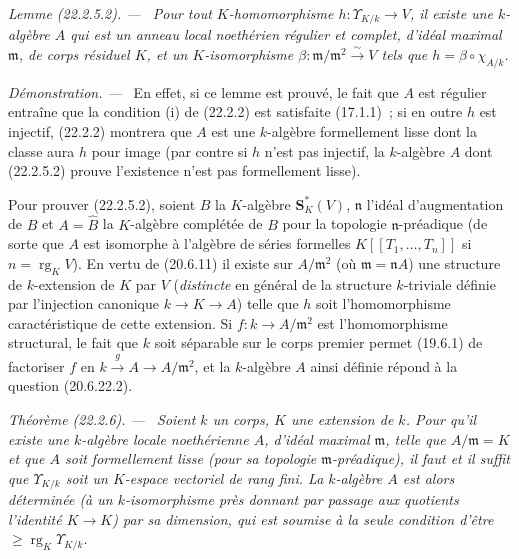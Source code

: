\documentclass[10pt,oneside]{book}
\makeatletter
\newcommand{\setmanualcurrentlabel}[1]{\def\@currentlabel{#1}}
\newenvironment{theorem}[1][]{%
  \setmanualcurrentlabel{#1}\par\medskip\noindent\itshape Théorème (#1). ---\ }{\par}
\newenvironment{lemma}[1][]{%
  \setmanualcurrentlabel{#1}\par\medskip\noindent\itshape Lemme (#1). ---\ }{\par}
\newenvironment{proof}{%
  \par\medskip\noindent\textit{Démonstration. ---\ }}{\par}
\makeatother
\begin{document}
\begin{lemma}[22.2.5.2]
\label{0.22.2.5.2-fr}
Pour tout $K$-homomorphisme $h:\Upsilon_{K/k}\to V$, il existe une
$k$-algèbre $A$ qui est un anneau local noethérien régulier et complet,
d'idéal maximal $\mathfrak m$, de corps résiduel $K$, et un $K$-isomorphisme
$\beta:\mathfrak m/\mathfrak m^2\xrightarrow{\sim}V$ tels que
$h=\beta\circ\chi_{A/k}$.
\end{lemma}

\begin{proof}
En effet, si ce lemme est prouvé, le fait que $A$ est régulier entraîne que
la condition (i) de (22.2.2) est satisfaite (17.1.1)~; si en outre $h$ est
injectif, (22.2.2) montrera que $A$ est une $k$-algèbre formellement lisse
dont la classe aura $h$ pour image (par contre si $h$ n'est pas injectif, la
$k$-algèbre $A$ dont (22.2.5.2) prouve l'existence n'est pas formellement
lisse).

Pour prouver (22.2.5.2), soient $B$ la $K$-algèbre $\mathbf S_K^*(V)$,
$\mathfrak n$ l'idéal d'augmentation de $B$ et $A=\widehat B$ la
$K$-algèbre complétée de $B$ pour la topologie $\mathfrak n$-préadique (de
sorte que $A$ est isomorphe à l'algèbre de séries formelles
$K[[T_1,\ldots,T_n]]$ si $n=\operatorname{rg}_KV$). En vertu de (20.6.11)
il existe sur $A/\mathfrak m^2$ (où $\mathfrak m=\mathfrak nA$) une structure
de $k$-extension de $K$ par $V$ (\emph{distincte} en général de la structure
$k$-triviale définie par l'injection canonique $k\to K\to A$) telle que $h$
soit l'homomorphisme caractéristique de cette extension. Si
$f:k\to A/\mathfrak m^2$ est l'homomorphisme structural, le fait que $k$
soit séparable sur le corps premier permet (19.6.1) de factoriser $f$ en
$k\xrightarrow{g}A\to A/\mathfrak m^2$, et la $k$-algèbre $A$ ainsi définie
répond à la question (20.6.22.2).
\end{proof}

\begin{theorem}[22.2.6]
\label{0.22.2.6-fr}
Soient $k$ un corps, $K$ une extension de $k$. Pour qu'il existe une
$k$-algèbre locale noethérienne $A$, d'idéal maximal $\mathfrak m$, telle que
$A/\mathfrak m=K$ et que $A$ soit formellement lisse (pour sa topologie
$\mathfrak m$-préadique), il faut et il suffit que $\Upsilon_{K/k}$ soit un
$K$-espace vectoriel de rang fini. La $k$-algèbre $A$ est alors déterminée
(à un $k$-isomorphisme près donnant par passage aux quotients l'identité
$K\to K$) par sa dimension, qui est soumise à la seule condition d'être
$\geqslant\operatorname{rg}_K\Upsilon_{K/k}$.
\end{theorem}
\end{document}
